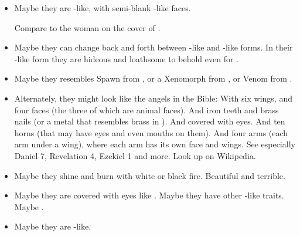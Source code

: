 \begin{itemize}
  \item 
    Maybe they are \bane-like, with semi-blank \bane-like faces. 
    
    Compare to the woman on the cover of .
    
  \item 
    Maybe they can change back and forth between \human-like and \bane-like forms. 
    In their \bane-like form they are hideous and loathsome to behold even for \resphain. 
    
  \item 
    Maybe they resembles Spawn from \cite{ToddMcFarlane:Spawn}, 
    or a Xenomorph from \cite{Movie:Alien}, 
    or Venom from \cite{StanLeeSteveDitko:SpiderMan}. 
    
  \item 
    Alternately, they might look like the angels in the Bible: 
    With six wings, and four faces (the three of which are animal faces).
    And iron teeth and brass nails (or a metal that resembles brass in \colour). 
    And covered with eyes. 
    And ten horns (that may have eyes and even mouths on them). 
    And four arms (each arm under a wing), where each arm has its own face and wings. 
    See especially Daniel 7, Revelation 4, Ezekiel 1 and more. 
    Look up  on Wikipedia. 
  
  \item 
    Maybe they shine and burn with white or black fire. 
    Beautiful and terrible. 
  
  \item 
    Maybe they are covered with eyes like \noggyaleth.
    Maybe they have other \noggyal-like traits. 
    Maybe . 
  
  \item 
    Maybe they are \dragon-like. 
\end{itemize}












